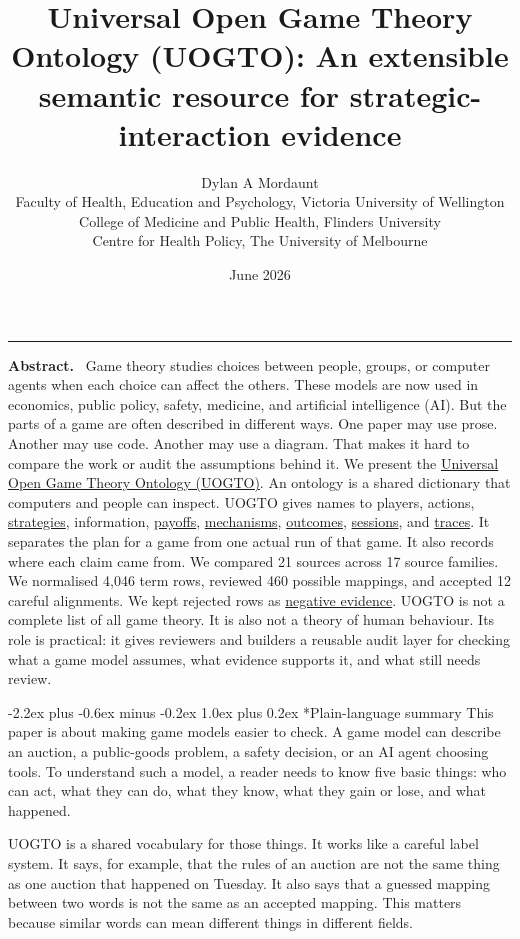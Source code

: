 \documentclass[11pt]{article}
\title{Universal Open Game Theory Ontology (UOGTO): An extensible semantic resource for strategic-interaction evidence}
\author{Dylan A Mordaunt\\
Faculty of Health, Education and Psychology, Victoria University of Wellington\\
College of Medicine and Public Health, Flinders University\\
Centre for Health Policy, The University of Melbourne}
\date{June 2026}
\makeatletter
\renewcommand\section{\@startsection{section}{1}{\z@}%
  {-2.2ex plus -0.6ex minus -0.2ex}%
  {1.0ex plus 0.2ex}%
  {\normalfont\Large\bfseries\color{uogtoInk}}}
\renewcommand{\maketitle}{%
  \begin{center}
    {\LARGE\bfseries\color{uogtoInk}\@title\par}
    \vspace{0.8em}
    {\large\color{uogtoMuted}\@author\par}
    \vspace{0.45em}
    {\color{uogtoMuted}\@date\par}
    \vspace{0.8em}
    {\color{uogtoAccent}\rule{0.72\linewidth}{0.8pt}\par}
  \end{center}
  \vspace{0.8em}
}
\renewenvironment{abstract}
  {\begin{center}\begin{minipage}{0.92\linewidth}\small\noindent\textbf{\color{uogtoInk}Abstract.}\ }
  {\end{minipage}\end{center}\vspace{0.7em}}
\newcommand{\glslink}[2]{\hyperlink{gloss:#1}{#2}}
\newcommand{\abblink}[2]{\hyperlink{abbr:#1}{#2}}
\makeatother
\begin{document}
\maketitle

\begin{abstract}
Game theory studies choices between people, groups, or computer agents when each choice can affect the others. These models are now used in economics, public policy, safety, medicine, and artificial intelligence (AI). But the parts of a game are often described in different ways. One paper may use prose. Another may use code. Another may use a diagram. That makes it hard to compare the work or audit the assumptions behind it. We present the \abblink{uogto}{Universal Open Game Theory Ontology (UOGTO)}. An ontology is a shared dictionary that computers and people can inspect. UOGTO gives names to players, actions, \glslink{strategy}{strategies}, information, \glslink{payoff}{payoffs}, \glslink{mechanism}{mechanisms}, \glslink{outcome}{outcomes}, \glslink{session}{sessions}, and \glslink{trace}{traces}. It separates the plan for a game from one actual run of that game. It also records where each claim came from. We compared 21 sources across 17 source families. We normalised 4,046 term rows, reviewed 460 possible mappings, and accepted 12 careful alignments. We kept rejected rows as \glslink{negative-evidence}{negative evidence}. UOGTO is not a complete list of all game theory. It is also not a theory of human behaviour. Its role is practical: it gives reviewers and builders a reusable audit layer for checking what a game model assumes, what evidence supports it, and what still needs review.
\end{abstract}

\section*{Plain-language summary}
This paper is about making game models easier to check. A game model can describe an auction, a public-goods problem, a safety decision, or an AI agent choosing tools. To understand such a model, a reader needs to know five basic things: who can act, what they can do, what they know, what they gain or lose, and what happened.

UOGTO is a shared vocabulary for those things. It works like a careful label system. It says, for example, that the rules of an auction are not the same thing as one auction that happened on Tuesday. It also says that a guessed mapping between two words is not the same as an accepted mapping. This matters because similar words can mean different things in different fields.
\end{document}
